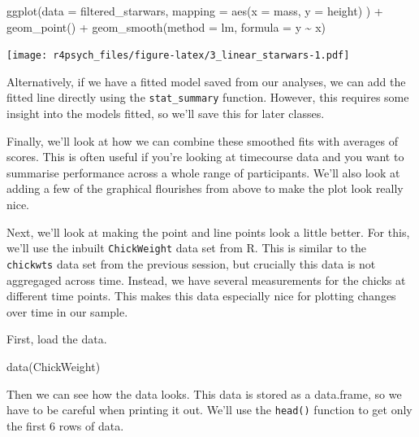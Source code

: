 \documentclass[
]{book}
\newenvironment{Shaded}{\begin{snugshade}}{\end{snugshade}}
\newcommand{\AttributeTok}[1]{\textcolor[rgb]{0.77,0.63,0.00}{#1}}
\newcommand{\FunctionTok}[1]{\textcolor[rgb]{0.00,0.00,0.00}{#1}}
\newcommand{\NormalTok}[1]{#1}
\newcommand{\SpecialCharTok}[1]{\textcolor[rgb]{0.00,0.00,0.00}{#1}}
\newcommand{\StringTok}[1]{\textcolor[rgb]{0.31,0.60,0.02}{#1}}
\begin{document}
\begin{Shaded}
\begin{Highlighting}[]
\FunctionTok{ggplot}\NormalTok{(}\AttributeTok{data =}\NormalTok{ filtered\_starwars, }
       \AttributeTok{mapping =} \FunctionTok{aes}\NormalTok{(}\AttributeTok{x =}\NormalTok{ mass, }\AttributeTok{y =}\NormalTok{ height)}
\NormalTok{       ) }\SpecialCharTok{+} 
  \FunctionTok{geom\_point}\NormalTok{() }\SpecialCharTok{+} 
  \FunctionTok{geom\_smooth}\NormalTok{(}\AttributeTok{method =} \StringTok{\textquotesingle{}lm\textquotesingle{}}\NormalTok{, }\AttributeTok{formula =}\NormalTok{ y }\SpecialCharTok{\textasciitilde{}}\NormalTok{ x)}
\end{Highlighting}
\end{Shaded}

\texttt{[image: r4psych\_files/figure-latex/3\_linear\_starwars-1.pdf]}

Alternatively, if we have a fitted model saved from our analyses, we can add the fitted line directly using the \texttt{stat\_summary} function. However, this requires some insight into the models fitted, so we'll save this for later classes.

Finally, we'll look at how we can combine these smoothed fits with averages of scores. This is often useful if you're looking at timecourse data and you want to summarise performance across a whole range of participants. We'll also look at adding a few of the graphical flourishes from above to make the plot look really nice.

Next, we'll look at making the point and line points look a little better. For this, we'll use the inbuilt \texttt{ChickWeight} data set from R. This is similar to the \texttt{chickwts} data set from the previous session, but crucially this data is not aggregaged across time. Instead, we have several measurements for the chicks at different time points. This makes this data especially nice for plotting changes over time in our sample.

First, load the data.

\begin{Shaded}
\begin{Highlighting}[]
\FunctionTok{data}\NormalTok{(ChickWeight)}
\end{Highlighting}
\end{Shaded}

Then we can see how the data looks. This data is stored as a data.frame, so we have to be careful when printing it out. We'll use the \texttt{head()} function to get only the first 6 rows of data.
\end{document}
